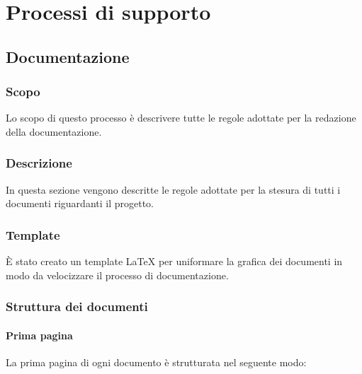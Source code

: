 \documentclass[./../NormediProgetto.tex]{subfiles}
\begin{document}
\chapter{Processi di supporto}

\section{Documentazione}

\subsection{Scopo} 

Lo scopo di questo processo è descrivere tutte le regole adottate per la redazione della documentazione. 
	
\subsection{Descrizione}

In questa sezione vengono descritte le regole adottate per la stesura di tutti i documenti riguardanti il progetto.

\subsection{Template}

È stato creato un template \LaTeX{} per uniformare la grafica dei documenti in modo da velocizzare il processo di documentazione.

\subsection{Struttura dei documenti}

\subsubsection{Prima pagina}

La prima pagina di ogni documento è strutturata nel seguente modo:
\end{document}

